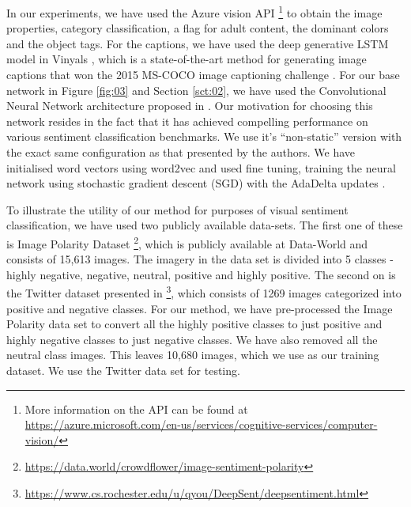 \documentclass[12pt,a4paper]{article}
\begin{document}
In our experiments, we have used the Azure vision API \footnote{More information on the API can be found at \url{https://azure.microsoft.com/en-us/services/cognitive-services/computer-vision/}} to obtain the image properties, category classification, a flag for adult content, the dominant colors and the object tags. For the captions, we have used the deep generative LSTM model in Vinyals \cite{Vinyals:2016}, which is a state-of-the-art method for generating image captions that won the 2015 MS-COCO image captioning challenge \cite{Lin:2014}. For our base network in Figure \ref{fig:03} and Section \ref{sct:02}, we have used the Convolutional Neural Network architecture proposed in \cite{Kim:2014}. Our motivation for choosing this network resides in the fact that it has achieved compelling performance on various sentiment classification benchmarks. We use it's ``non-static'' version with the exact same configuration as that presented by the authors. We have initialised word vectors using word2vec \cite{Mikolov:2014} and used fine tuning, training the neural network using stochastic gradient descent (SGD) with the AdaDelta updates \cite{Zeiler:2012}.
\vspace{2mm}

To illustrate the utility of our method for purposes of visual sentiment classification, we have used two publicly available data-sets. The first one of these is Image Polarity Dataset \footnote{%
\url{https://data.world/crowdflower/image-sentiment-polarity}}, which is publicly available at Data-World and consists of 15,613 images. The imagery in the data set is divided into 5 classes - highly negative, negative, neutral, positive and highly positive. The second on is the Twitter dataset presented in \cite{You:2015} \footnote{\url{https://www.cs.rochester.edu/u/qyou/DeepSent/deepsentiment.html}}, which consists of 1269 images categorized into positive and negative classes. For our method, we have pre-processed the Image Polarity data set to convert all the highly positive classes to just positive and highly negative classes to just negative classes. We have also removed all the neutral class images. This leaves 10,680 images, which we use as our training dataset. We use the Twitter data set for testing.
\vspace{2mm}
\end{document}
